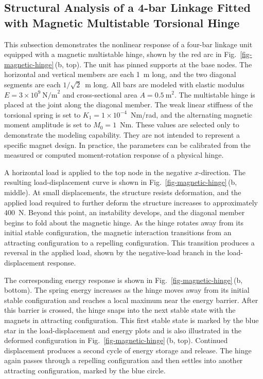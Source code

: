 \subsection{Structural Analysis of a 4-bar Linkage Fitted with Magnetic Multistable Torsional Hinge}\label{04-subsec-magnetic-hinge-results}
This subsection demonstrates the nonlinear response of a four-bar linkage unit equipped with a magnetic multistable hinge, shown by the red arc in Fig.~\ref{fig-magnetic-hinge}\,(b, top). The unit has pinned supports at the base nodes. The horizontal and vertical members are each 1~m long, and the two diagonal segments are each \(1/\sqrt{2}\)~m long. All bars are modeled with elastic modulus \(E=3\times10^9~\text{N/m}^2\) and cross-sectional area \(A=0.5~\text{m}^2\). The multistable hinge is placed at the joint along the diagonal member. The weak linear stiffness of the torsional spring is set to \(K_1=1\times10^{-4}\)~Nm/rad, and the alternating magnetic moment amplitude is set to \(M_0=1\)~Nm. These values are selected only to demonstrate the modeling capability. They are not intended to represent a specific magnet design. In practice, the parameters can be calibrated from the measured or computed moment-rotation response of a physical hinge.

A horizontal load is applied to the top node in the negative \(x\)-direction. The resulting load-displacement curve is shown in Fig.~\ref{fig-magnetic-hinge}\,(b, middle). At small displacements, the structure resists deformation, and the applied load required to further deform the structure increases to approximately 400~N. Beyond this point, an instability develops, and the diagonal member begins to fold about the magnetic hinge. As the hinge rotates away from its initial stable configuration, the magnetic interaction transitions from an attracting configuration to a repelling configuration. This transition produces a reversal in the applied load, shown by the negative-load branch in the load-displacement response.

The corresponding energy response is shown in Fig.~\ref{fig-magnetic-hinge}\,(b, bottom). The spring energy increases as the hinge moves away from its initial stable configuration and reaches a local maximum near the energy barrier. After this barrier is crossed, the hinge snaps into the next stable state with the magnets in attracting configuration. This first stable state is marked by the blue star in the load-displacement and energy plots and is also illustrated in the deformed configuration in Fig.~\ref{fig-magnetic-hinge}\,(b, top). Continued displacement produces a second cycle of energy storage and release. The hinge again passes through a repelling configuration and then settles into another attracting configuration, marked by the blue circle.

